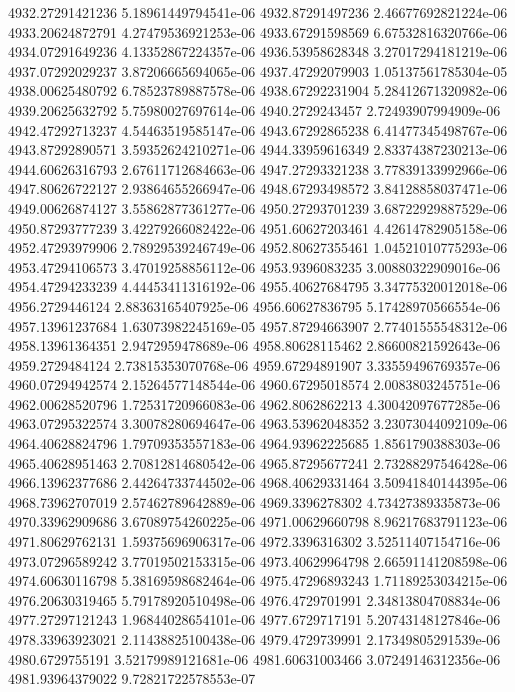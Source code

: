 {4932.27291421236 5.18961449794541e-06
4932.87291497236 2.46677692821224e-06
4933.20624872791 4.27479536921253e-06
4933.67291598569 6.67532816320766e-06
4934.07291649236 4.13352867224357e-06
4936.53958628348 3.27017294181219e-06
4937.07292029237 3.87206665694065e-06
4937.47292079903 1.05137561785304e-05
4938.00625480792 6.78523789887578e-06
4938.67292231904 5.28412671320982e-06
4939.20625632792 5.75980027697614e-06
4940.2729243457 2.72493907994909e-06
4942.47292713237 4.54463519585147e-06
4943.67292865238 6.41477345498767e-06
4943.87292890571 3.59352624210271e-06
4944.33959616349 2.83374387230213e-06
4944.60626316793 2.67611712684663e-06
4947.27293321238 3.77839133992966e-06
4947.80626722127 2.93864655266947e-06
4948.67293498572 3.84128858037471e-06
4949.00626874127 3.55862877361277e-06
4950.27293701239 3.68722929887529e-06
4950.87293777239 3.42279266082422e-06
4951.60627203461 4.42614782905158e-06
4952.47293979906 2.78929539246749e-06
4952.80627355461 1.04521010775293e-06
4953.47294106573 3.47019258856112e-06
4953.9396083235 3.00880322909016e-06
4954.47294233239 4.44453411316192e-06
4955.40627684795 3.34775320012018e-06
4956.2729446124 2.88363165407925e-06
4956.60627836795 5.17428970566554e-06
4957.13961237684 1.63073982245169e-05
4957.87294663907 2.77401555548312e-06
4958.13961364351 2.9472959478689e-06
4958.80628115462 2.86600821592643e-06
4959.2729484124 2.73815353070768e-06
4959.67294891907 3.33559496769357e-06
4960.07294942574 2.15264577148544e-06
4960.67295018574 2.0083803245751e-06
4962.00628520796 1.72531720966083e-06
4962.8062862213 4.30042097677285e-06
4963.07295322574 3.30078280694647e-06
4963.53962048352 3.23073044092109e-06
4964.40628824796 1.79709353557183e-06
4964.93962225685 1.8561790388303e-06
4965.40628951463 2.70812814680542e-06
4965.87295677241 2.73288297546428e-06
4966.13962377686 2.44264733744502e-06
4968.40629331464 3.50941840144395e-06
4968.73962707019 2.57462789642889e-06
4969.3396278302 4.73427389335873e-06
4970.33962909686 3.67089754260225e-06
4971.00629660798 8.96217683791123e-06
4971.80629762131 1.59375696906317e-06
4972.3396316302 3.52511407154716e-06
4973.07296589242 3.77019502153315e-06
4973.40629964798 2.66591141208598e-06
4974.60630116798 5.38169598682464e-06
4975.47296893243 1.71189253034215e-06
4976.20630319465 5.79178920510498e-06
4976.4729701991 2.34813804708834e-06
4977.27297121243 1.96844028654101e-06
4977.6729717191 5.20743148127846e-06
4978.33963923021 2.11438825100438e-06
4979.4729739991 2.17349805291539e-06
4980.6729755191 3.52179989121681e-06
4981.60631003466 3.07249146312356e-06
4981.93964379022 9.72821722578553e-07
}
